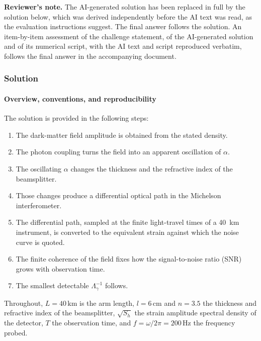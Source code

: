 \providecommand{\citep}[2][]{\cite{#2}}
\providecommand{\citet}[2][]{\cite{#2}}
\providecommand{\citealt}[2][]{\cite{#2}}
\providecommand{\nat}{Nature}
\providecommand{\prl}{Physical Review Letters}
\providecommand{\prd}{Physical Review D}
\providecommand{\pra}{Physical Review A}

{\color{blue}\textbf{Reviewer's note.} The AI-generated solution has been replaced in full by the solution below, which was derived independently before the AI text was read, as the evaluation instructions suggest. The final answer follows the solution. An item-by-item assessment of the challenge statement, of the AI-generated solution and of its numerical script, with the AI text and script reproduced verbatim, follows the final answer in the accompanying document.}

\subsubsection*{Solution}

\paragraph*{Overview, conventions, and reproducibility}
The solution is provided in the following steps:
%
\begin{enumerate}[label=Step~\arabic*:,leftmargin=*,align=left,labelsep=0.5em,parsep=0pt,itemsep=0.1em,topsep=0.2em]
    \item The dark-matter field amplitude is obtained from the stated density.
    \item The photon coupling turns the field into an apparent oscillation of $\alpha$.
    \item The oscillating $\alpha$ changes the thickness and the refractive index of the beamsplitter.
    \item Those changes produce a differential optical path in the Michelson interferometer.
    \item The differential path, sampled at the finite light-travel times of a 40~km instrument, is converted to the equivalent strain against which the noise curve is quoted.
    \item The finite coherence of the field fixes how the signal-to-noise ratio (SNR) grows with observation time.
    \item The smallest detectable $\Lambda_\gamma^{-1}$ follows.
\end{enumerate}
%
Throughout, $L=40\,\mathrm{km}$ is the arm length, $l=6\,\mathrm{cm}$ and $n=3.5$ the thickness and refractive index of the beamsplitter, $\sqrt{S_h}$ the strain amplitude spectral density of the detector, $T$ the observation time, and $f=\omega/2\pi=200\,\mathrm{Hz}$ the frequency probed.

